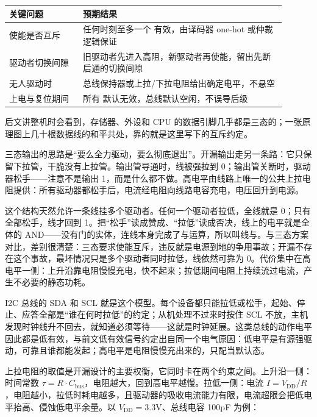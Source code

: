 \begin{longtable}{L{0.24\linewidth}L{0.66\linewidth}}
\toprule
关键问题 & 预期结果 \\
\midrule
使能是否互斥 & 任何时刻至多一个  有效，由译码器 one-hot 或仲裁逻辑保证 \\\tablerowrule
驱动者切换间隙 & 旧驱动者先进入高阻，新驱动者再使能，留出先断后通的切换间隙 \\\tablerowrule
无人驱动时 & 总线保持器或上拉/下拉电阻给出确定电平，不悬空 \\\tablerowrule
上电与复位期间 & 所有  默认无效，总线默认空闲，不误导后级 \\
\bottomrule
\end{longtable}

后文讲整机时会看到，存储器、外设和 CPU 的数据引脚几乎都是三态的；一张原理图上几十根数据线的和平共处，靠的就是这里写下的互斥约定。

三态输出的思路是“要么全力驱动，要么彻底退出”。开漏输出走另一条路：它只保留下拉管，干脆没有上拉管。输出管导通时，线被强拉到 0；输出管关断时，驱动器松手——注意不是输出 1，而是什么都不做。高电平由线路上唯一的公共上拉电阻提供：所有驱动器都松手后，电流经电阻向线路电容充电，电压回升到电源。

这个结构天然允许一条线挂多个驱动者。任何一个驱动者拉低，全线就是 0；只有全部松手，线才回到 1。把“松手”读成赞成、“拉低”读成否决，线上的电平就是全体的 AND——没有门的实体，连线本身完成了与运算，所以叫线与。与三态方案对比，差别很清楚：三态要求使能互斥，违反就是电源到地的争用事故；开漏不存在这个事故，最坏情况只是多个驱动者同时拉低，线依然可靠为 0。代价集中在高电平一侧：上升沿靠电阻慢慢充电，快不起来；拉低期间电阻上持续流过电流，产生不必要的静态功耗。

I2C 总线的 SDA 和 SCL 就是这个模型。每个设备都只能拉低或松手，起始、停止、应答全部是“谁在何时拉低”的约定；从机处理不过来时按住 SCL 不放，主机发现时钟线升不回去，就知道必须等待——这就是时钟延展。这类总线的动作电平因此都是低有效，与前文低有效信号约定出自同一个电气原因：低电平是有源强驱动，可靠且谁都能发起；高电平是电阻慢慢充出来的，只配当默认态。

上拉电阻的取值是开漏设计的主要权衡，它同时卡在两个约束之间。上升沿一侧：时间常数 $\tau = R \cdot C_{\mathrm{bus}}$，电阻越大，回到高电平越慢。拉低一侧：电流 $I = V_{\mathrm{DD}} / R$，电阻越小，拉低时耗电越多，且驱动器的吸收电流能力有限，电流超限会把低电平抬高、侵蚀低电平余量。以 $V_{\mathrm{DD}} = 3.3\mathrm{V}$、总线电容 100pF 为例：

